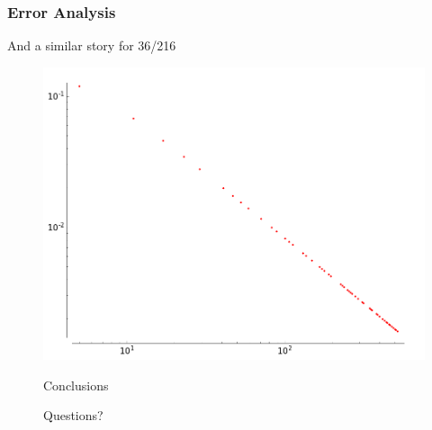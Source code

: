 \documentclass{beamer}
\begin{document}
\begin{frame}
\frametitle{Error Analysis}
And a similar story for 36/216
\begin{figure}[H]
\centering
\includegraphics[width=.8\textwidth]{divisibility_claim_2}
\end{figure}
\end{frame}

\begin{frame}
\begin{figure}[H]
\centering
{\Large Conclusions}
\end{figure}
\end{frame}

\begin{frame}
\begin{figure}[H]
\centering
{\Large Questions?}
\end{figure}
\end{frame}
\end{document}
